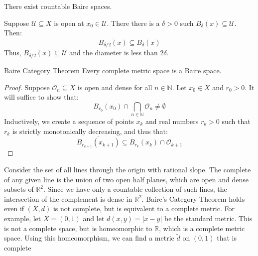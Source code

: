 \documentclass[crop=false,class=article,oneside]{standalone}
\begin{document}
        \begin{theorem}
            There exist countable Baire spaces.
        \end{theorem}
        Suppose $\mathcal{U}\subseteq{X}$ is open at
        $x_{0}\in\mathcal{U}$. There there is a $\delta>0$ such
        $B_{\delta}(x)\subseteq\mathcal{U}$. Then:
        \begin{equation}
            \overline{B_{\delta/2}(x)}\subseteq{B}_{\delta}(x)
        \end{equation}
        Thus, $\overline{B_{\delta/2}(x)}\subseteq\mathcal{U}$
        and the diameter is less than $2\delta$.
        \begin{ltheorem}{Baire Category Theorem}
            Every complete metric space is a Baire space.
        \end{ltheorem}
        \begin{proof}
            Suppose $\mathcal{O}_{n}\subseteq{X}$ is open and
            dense for all $n\in\mathbb{N}$. Let $x_{0}\in{X}$ and
            $r_{0}>0$. It will suffice to show that:
            \begin{equation}
                B_{r_{0}}(x_{0})\cap\bigcap_{n\in\mathbb{N}}
                    \mathcal{O}_{n}\ne\emptyset
            \end{equation}
            Inductively, we create a sequence of points $x_{k}$
            and real numbers $r_{k}>0$ such that $r_{k}$ is strictly
            monotonically decreasing, and thus that:
            \begin{equation}
                \overline{B_{r_{k+1}}(x_{k+1})}
                \subseteq{B}_{r_{k}}(x_{k})\cap\mathcal{O}_{k+1}
            \end{equation}
        \end{proof}
        Consider the set of all lines through the origin with
        rational slope. The complete of any given line is the
        union of two open half planes, which are open and dense
        subsets of $\mathbb{R}^{2}$. Since we have only a countable
        collection of such lines, the intersection of the complement
        is dense in $\mathbb{R}^{2}$. Baire's Category Theorem
        holds even if $(X,d)$ is not complete, but is equivalent
        to a complete metric. For example, let $X=(0,1)$ and let
        $d(x,y)=|x-y|$ be the standard metric. This is not a
        complete space, but is homeomorphic to $\mathbb{R}$, 
        which is a complete metric space. Using this homeomorphism,
        we can find a metric $\tilde{d}$ on $(0,1)$ that is complete
\end{document}
